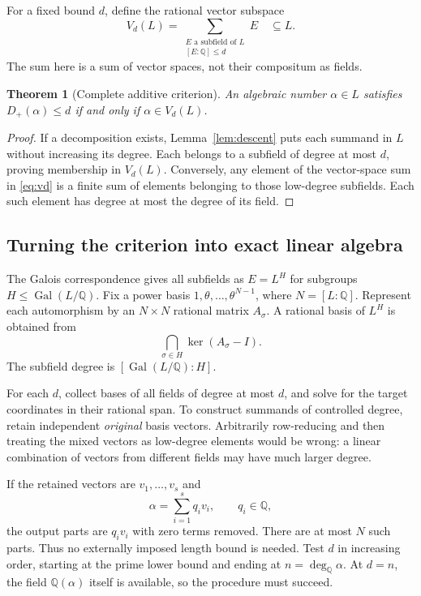 \documentclass[11pt,a4paper]{article}
\newtheorem{theorem}{Theorem}[section]
\theoremstyle{definition}\newtheorem{definition}[theorem]{Definition}
\theoremstyle{remark}\newtheorem{remark}[theorem]{Remark}
\newcommand{\Q}{\mathbb{Q}}\newcommand{\C}{\mathbb{C}}
\newcommand{\Gal}{\operatorname{Gal}}
\newcommand{\degQ}{\deg_{\Q}}
\begin{document}
For a fixed bound $d$, define the rational vector subspace
\begin{equation}
V_d(L)=\sum_{\substack{E\text{ a subfield of }L\\{}[E:\Q]\leq d}} E
       \quad\subseteq L.\label{eq:vd}
\end{equation}
The sum here is a sum of vector spaces, not their compositum as fields.

\begin{theorem}[Complete additive criterion]\label{thm:sum}
An algebraic number $\alpha\in L$ satisfies $D_+(\alpha)\leq d$ if and only if $\alpha\in V_d(L)$.
\end{theorem}
\begin{proof}
If a decomposition exists, Lemma~\ref{lem:descent} puts each summand in $L$ without increasing its degree. Each belongs to a subfield of degree at most $d$, proving membership in $V_d(L)$. Conversely, any element of the vector-space sum in \eqref{eq:vd} is a finite sum of elements belonging to those low-degree subfields. Each such element has degree at most the degree of its field.\end{proof}

\subsection{Turning the criterion into exact linear algebra}
The Galois correspondence gives all subfields as $E=L^H$ for subgroups $H\leq\Gal(L/\Q)$. Fix a power basis $1,\theta,\ldots,\theta^{N-1}$, where $N=[L:\Q]$. Represent each automorphism by an $N\times N$ rational matrix $A_\sigma$. A rational basis of $L^H$ is obtained from
\begin{equation}
\bigcap_{\sigma\in H}\ker(A_\sigma-I).
\end{equation}
The subfield degree is $[\Gal(L/\Q):H]$.

For each $d$, collect bases of all fields of degree at most $d$, and solve for the target coordinates in their rational span. To construct summands of controlled degree, retain independent \emph{original} basis vectors. Arbitrarily row-reducing and then treating the mixed vectors as low-degree elements would be wrong: a linear combination of vectors from different fields may have much larger degree.

If the retained vectors are $v_1,\ldots,v_s$ and
\[
\alpha=\sum_{i=1}^s q_i v_i,\qquad q_i\in\Q,
\]
the output parts are $q_i v_i$ with zero terms removed. There are at most $N$ such parts. Thus no externally imposed length bound is needed. Test $d$ in increasing order, starting at the prime lower bound and ending at $n=\degQ\alpha$. At $d=n$, the field $\Q(\alpha)$ itself is available, so the procedure must succeed.
\end{document}
